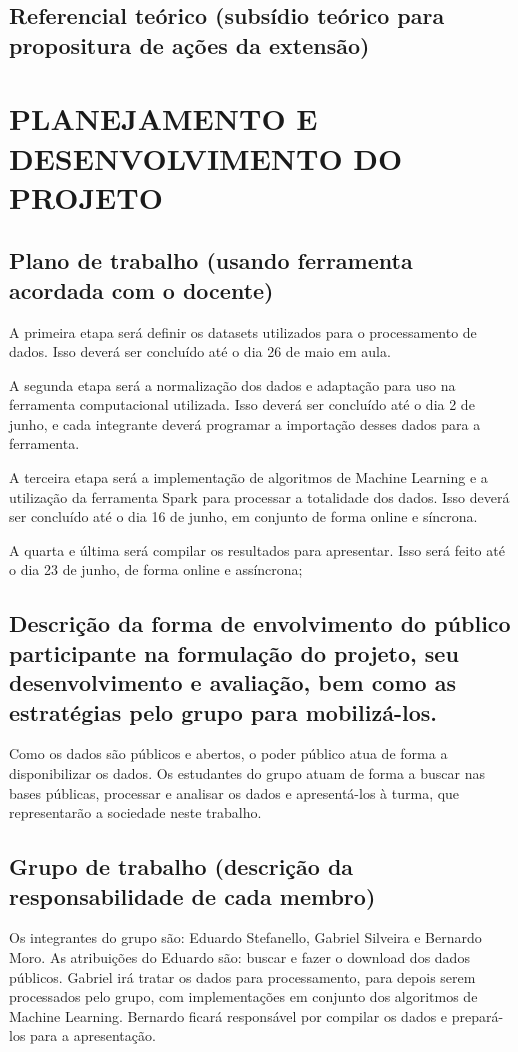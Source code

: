 \documentclass{article}
\begin{document}
\subsection{Referencial teórico (subsídio teórico para propositura de ações da extensão)}

\section{PLANEJAMENTO E DESENVOLVIMENTO DO PROJETO}

\subsection{Plano de trabalho (usando ferramenta acordada com o docente)}
A primeira etapa será definir os datasets utilizados para o processamento de dados. Isso deverá ser concluído até o dia 26 de maio em aula.

A segunda etapa será a normalização dos dados e adaptação para uso na ferramenta computacional utilizada. Isso deverá ser concluído até o dia 2 de junho, e cada integrante deverá programar a importação desses dados para a ferramenta.

A terceira etapa será a implementação de algoritmos de Machine Learning e a utilização da ferramenta Spark para processar a totalidade dos dados. Isso deverá ser concluído até o dia 16 de junho, em conjunto de forma online e síncrona.

A quarta e última será compilar os resultados para apresentar. Isso será feito até o dia 23 de junho, de forma online e assíncrona;

\subsection{Descrição da forma de envolvimento do público participante na formulação do projeto, seu desenvolvimento e avaliação, bem como as estratégias pelo grupo para mobilizá-los.}

Como os dados são públicos e abertos, o poder público atua de forma a disponibilizar os dados. Os estudantes do grupo atuam de forma a buscar nas bases públicas, processar e analisar os dados e apresentá-los à turma, que representarão a sociedade neste trabalho.

\subsection{Grupo de trabalho (descrição da responsabilidade de cada membro)}
Os integrantes do grupo são: Eduardo Stefanello, Gabriel Silveira e Bernardo Moro. As atribuições do Eduardo são: buscar e fazer o download dos dados públicos. Gabriel irá tratar os dados para processamento, para depois serem processados pelo grupo, com implementações em conjunto dos algoritmos de Machine Learning. Bernardo ficará responsável por compilar os dados  e prepará-los para a apresentação.
\end{document}
